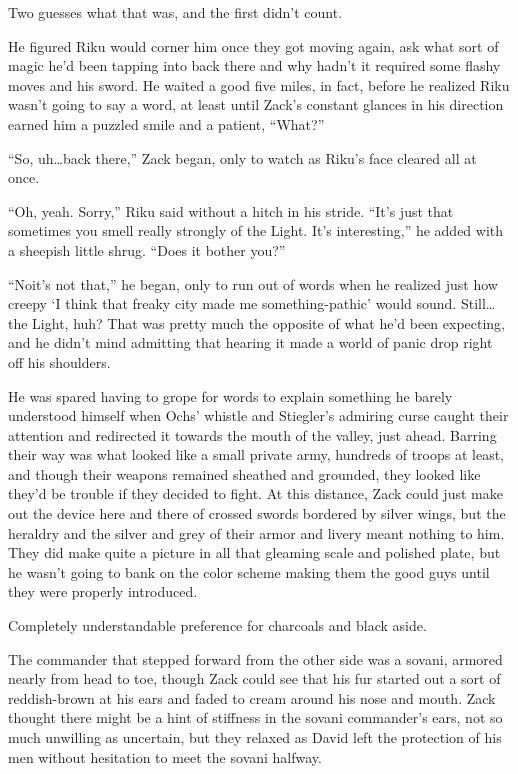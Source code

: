 Two guesses what that was, and the first didn't count.

He figured Riku would corner him once they got moving again, ask what sort of magic he'd been tapping into back there and why hadn't it required some flashy moves and his sword. He waited a good five miles, in fact, before he realized Riku wasn't going to say a word, at least until Zack's constant glances in his direction earned him a puzzled smile and a patient, ``What?''

``So, uh\ldots back there,'' Zack began, only to watch as Riku's face cleared all at once.

``Oh, yeah. Sorry,'' Riku said without a hitch in his stride. ``It's just that sometimes you smell really strongly of the Light. It's interesting,'' he added with a sheepish little shrug. ``Does it bother you?''

``No\textemdash it's not that,'' he began, only to run out of words when he realized just how creepy `I think that freaky city made me something-pathic' would sound. Still\ldots the Light, huh? That was pretty much the opposite of what he'd been expecting, and he didn't mind admitting that hearing it made a world of panic drop right off his shoulders.

He was spared having to grope for words to explain something he barely understood himself when Ochs' whistle and Stiegler's admiring curse caught their attention and redirected it towards the mouth of the valley, just ahead. Barring their way was what looked like a small private army, hundreds of troops at least, and though their weapons remained sheathed and grounded, they looked like they'd be trouble if they decided to fight. At this distance, Zack could just make out the device here and there of crossed swords bordered by silver wings, but the heraldry and the silver and grey of their armor and livery meant nothing to him. They did make quite a picture in all that gleaming scale and polished plate, but he wasn't going to bank on the color scheme making them the good guys until they were properly introduced.

Completely understandable preference for charcoals and black aside.

The commander that stepped forward from the other side was a sovani, armored nearly from head to toe, though Zack could see that his fur started out a sort of reddish-brown at his ears and faded to cream around his nose and mouth. Zack thought there might be a hint of stiffness in the sovani commander's ears, not so much unwilling as uncertain, but they relaxed as David left the protection of his men without hesitation to meet the sovani halfway.

